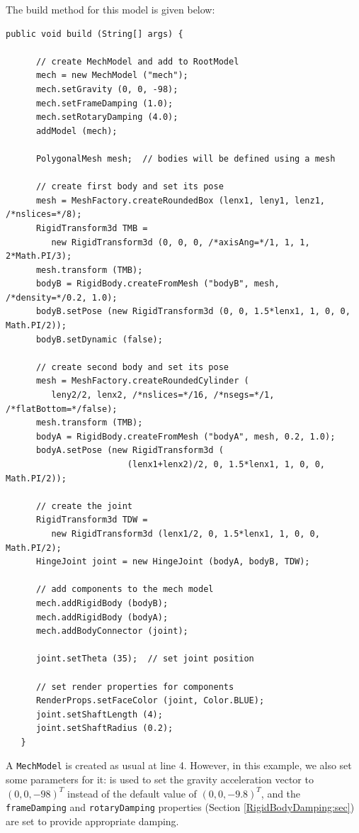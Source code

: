 The build method for this model is given below:
\lstset{numbers=left}
\begin{lstlisting}[]
   public void build (String[] args) {

      // create MechModel and add to RootModel
      mech = new MechModel ("mech");
      mech.setGravity (0, 0, -98);
      mech.setFrameDamping (1.0);
      mech.setRotaryDamping (4.0);
      addModel (mech);

      PolygonalMesh mesh;  // bodies will be defined using a mesh

      // create first body and set its pose
      mesh = MeshFactory.createRoundedBox (lenx1, leny1, lenz1, /*nslices=*/8);
      RigidTransform3d TMB = 
         new RigidTransform3d (0, 0, 0, /*axisAng=*/1, 1, 1, 2*Math.PI/3);
      mesh.transform (TMB);
      bodyB = RigidBody.createFromMesh ("bodyB", mesh, /*density=*/0.2, 1.0);
      bodyB.setPose (new RigidTransform3d (0, 0, 1.5*lenx1, 1, 0, 0, Math.PI/2));
      bodyB.setDynamic (false);

      // create second body and set its pose
      mesh = MeshFactory.createRoundedCylinder (
         leny2/2, lenx2, /*nslices=*/16, /*nsegs=*/1, /*flatBottom=*/false);
      mesh.transform (TMB);
      bodyA = RigidBody.createFromMesh ("bodyA", mesh, 0.2, 1.0);
      bodyA.setPose (new RigidTransform3d (
                        (lenx1+lenx2)/2, 0, 1.5*lenx1, 1, 0, 0, Math.PI/2));

      // create the joint      
      RigidTransform3d TDW = 
         new RigidTransform3d (lenx1/2, 0, 1.5*lenx1, 1, 0, 0, Math.PI/2);
      HingeJoint joint = new HingeJoint (bodyA, bodyB, TDW);

      // add components to the mech model
      mech.addRigidBody (bodyB);
      mech.addRigidBody (bodyA);
      mech.addBodyConnector (joint);

      joint.setTheta (35);  // set joint position

      // set render properties for components
      RenderProps.setFaceColor (joint, Color.BLUE);
      joint.setShaftLength (4);
      joint.setShaftRadius (0.2);
   }
\end{lstlisting}
\lstset{numbers=none}

A {\tt MechModel} is created as usual at line 4. However, in this
example, we also set some parameters for it:
 is
used to set the gravity acceleration vector to $(0, 0, -98)^T$ instead
of the default value of $(0, 0, -9.8)^T$, and the {\tt frameDamping}
and {\tt rotaryDamping} properties (Section
\ref{RigidBodyDamping:sec}) are set to provide appropriate damping.

